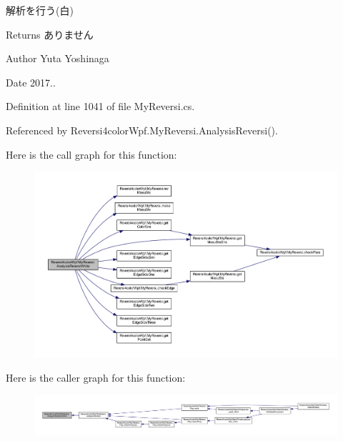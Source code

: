 解析を行う(白) 

\begin{DoxyReturn}{Returns}
ありません 
\end{DoxyReturn}
\begin{DoxyAuthor}{Author}
Yuta Yoshinaga 
\end{DoxyAuthor}
\begin{DoxyDate}{Date}
2017.. 
\end{DoxyDate}


Definition at line 1041 of file My\+Reversi.\+cs.



Referenced by Reversi4color\+Wpf.\+My\+Reversi.\+Analysis\+Reversi().



Here is the call graph for this function\+:
\nopagebreak
\begin{figure}[H]
\begin{center}
\leavevmode
\includegraphics[width=350pt]{class_reversi4color_wpf_1_1_my_reversi_a93276b74fb1de8525be31615ff03427e_cgraph}
\end{center}
\end{figure}




Here is the caller graph for this function\+:
\nopagebreak
\begin{figure}[H]
\begin{center}
\leavevmode
\includegraphics[width=350pt]{class_reversi4color_wpf_1_1_my_reversi_a93276b74fb1de8525be31615ff03427e_icgraph}
\end{center}
\end{figure}



